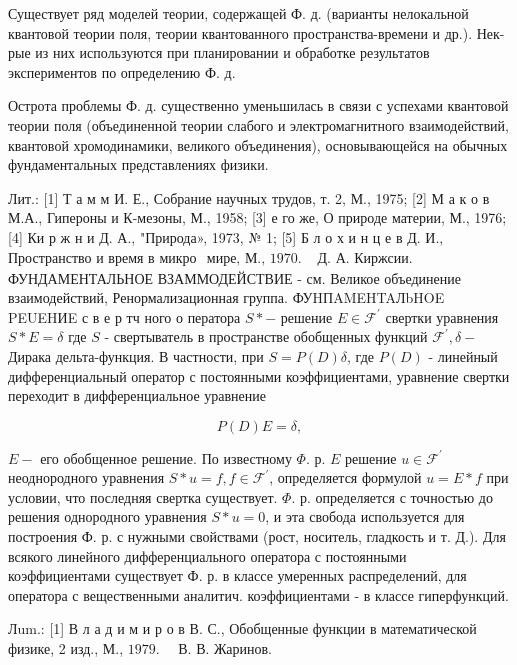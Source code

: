 \documentclass[10pt]{article}
\begin{document}
Существует ряд моделей теории, содержащей Ф. д. (варианты нелокальной квантовой теории поля, теории квантованного пространства-времени и др.). Нек-рые из них используются при планировании и обработке результатов экспериментов по определению Ф. д.



Острота проблемы Ф. д. существенно уменьшилась в связи с успехами квантовой теории поля (объединенной теории слабого и электромагнитного взаимодействий, квантовой хромодинамики, великого объединения), основывающейся на обычных фундаментальных представлениях физики.



Лит.: [1] Т а м м И. Е., Собрание научных трудов, т. 2, М., 1975; [2] М а к о в М.А., Гипероны и К-мезоны, М., 1958; [3] е го же, О природе материи, М., 1976; [4] Ки р ж н и Д. А., "Природа», 1973, № 1; [5] Б л о х и н ц е в Д. И., Пространство и время в микро$\begin{array}{ll}\text { мире, М., } 1970 . & \text { Д. А. Киржсии. }\end{array}$ ФУНДАМЕНТАЛЬНОЕ ВЗАММОДЕЙСТВИЕ - см. Великое объединение взаимодействий, Ренормализационная группа. ФУHПAMEHTAЛbHOE PEUEHИE с в е р тч ного о ператора $S *-$ решение $E \in \mathscr{F}^{\prime}$ свертки уравнения $S * E=\delta$ где $S$ - свертыватель в пространстве обобщенных функций $\mathscr{F}^{\prime}, \delta-$ Дирака дельта-функция. В частности, при $S=P(D) \delta$, где $P(D)$ - линейный дифференциальный оператор с постоянными коэффициентами, уравнение свертки переходит в дифференциальное уравнение



\[

P(D) E=\delta,

\]



$E-$ его обобщенное решение. По известному $\Phi$. р. $E$ решение $u \in \mathscr{F}^{\prime}$ неоднородного уравнения $S * u=f, f \in \mathscr{F}^{\prime}$, определяется формулой $u=E * f$ при условии, что последняя свертка существует. $\Phi$. р. определяется с точностью до решения однородного уравнения $S * u=0$, и эта свобода используется для построения Ф. р. с нужными свойствами (рост, носитель, гладкость и т. Д.). Для всякого линейного дифференциального оператора с постоянными коэффициентами существует Ф. р. в классе умеренных распределений, для оператора с вещественными аналитич. коэффициентами - в классе гиперфункций.



Лum.: [1] В л а д и м и р о в В. С., Обобщенные функции в математической физике, 2 изд., М., $1979 . \quad$ В. В. Жаринов.
\end{document}

